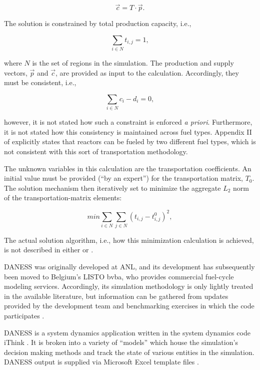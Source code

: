\begin{equation}
\vec{c} = T \cdot \vec{p}.
\end{equation}

The solution is constrained by total production capacity, i.e., 

\begin{equation}
\sum_{i \in N} t_{i,j} = 1,
\end{equation}

where $N$ is the set of regions in the simulation. The production and supply
vectors, $\vec{p}$ and $\vec{c}$, are provided as input to the
calculation. Accordingly, they must be consistent, i.e.,

\begin{equation}
\sum_{i \in N} c_i - d_i = 0,
\end{equation}

however, it is not stated how such a constraint is enforced \textit{a
  priori}. Furthermore, it is not stated how this consistency is maintained
across fuel types. Appendix II of \cite{_international_2009} explicitly states
that reactors can be fueled by two different fuel types, which is not consistent
with this sort of transportation methodology. 

The unknown variables in this calculation are the transportation
coefficients. An initial value must be provided (``by an expert'') for the
transportation matrix, $T_0$. The solution mechanism then iteratively set to
minimize the aggregate $L_2$ norm of the transportation-matrix elements:

\begin{equation}
min \sum_{i \in N} \sum_{j \in N} \left( t_{i,j} - t_{i,j}^0 \right)^2,
\end{equation}

The actual solution algorithm, i.e., how this minimization calculation is
achieved, is not described in either \cite{iaea_nuclear_2010} or
\cite{andrianova_desae_2008}.

DANESS was originally developed at ANL, and its development has subsequently
been moved to Belgium's LISTO bvba, who provides commercial fuel-cycle modeling
services. Accordingly, its simulation methodology is only lightly treated in the
available literature, but information can be gathered from updates provided by
the development team \cite{durpel_daness_2003,van_den_durpel_daness_2009} and
benchmarking exercises in which the code participates
\cite{guerin_benchmark_2009}.

DANESS is a system dynamics application written in the system dynamics code
iThink \cite{richmond_ithink_2004}. It is broken into a variety of ``models''
which house the simulation's decision making methods and track the state of
various entities in the simulation. DANESS output is supplied via Microsoft
Excel template files \cite{guerin_benchmark_2009}.

